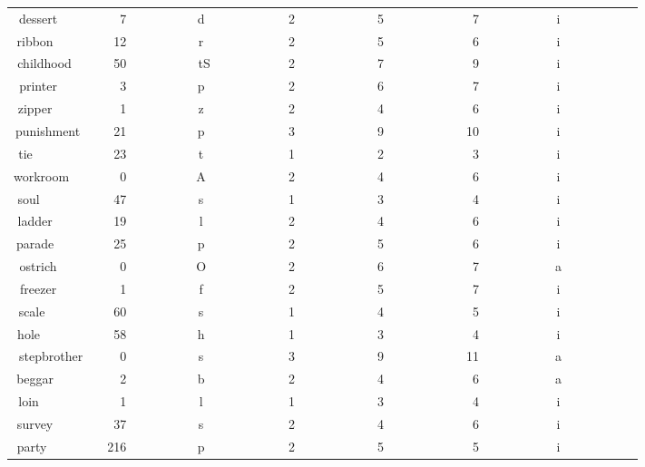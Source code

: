 \begin{longtable}{|c|c|c|c|c|c|c|}
dessert~~~~~&~~7~~~~~~~~~&d~~~~~~~~~~~&2~~~~~~~~~~~&5~~~~~~~~~~~&~7~~~~~~~~~~&i~~~~~~~~~~~\\ 
ribbon~~~~~~&~12~~~~~~~~~&r~~~~~~~~~~~&2~~~~~~~~~~~&5~~~~~~~~~~~&~6~~~~~~~~~~&i~~~~~~~~~~~\\ 
childhood~~~&~50~~~~~~~~~&tS~~~~~~~~~~&2~~~~~~~~~~~&7~~~~~~~~~~~&~9~~~~~~~~~~&i~~~~~~~~~~~\\ 
printer~~~~~&~~3~~~~~~~~~&p~~~~~~~~~~~&2~~~~~~~~~~~&6~~~~~~~~~~~&~7~~~~~~~~~~&i~~~~~~~~~~~\\ 
zipper~~~~~~&~~1~~~~~~~~~&z~~~~~~~~~~~&2~~~~~~~~~~~&4~~~~~~~~~~~&~6~~~~~~~~~~&i~~~~~~~~~~~\\ 
punishment~~&~21~~~~~~~~~&p~~~~~~~~~~~&3~~~~~~~~~~~&9~~~~~~~~~~~&10~~~~~~~~~~&i~~~~~~~~~~~\\ 
tie~~~~~~~~~&~23~~~~~~~~~&t~~~~~~~~~~~&1~~~~~~~~~~~&2~~~~~~~~~~~&~3~~~~~~~~~~&i~~~~~~~~~~~\\ 
workroom~~~~&~~0~~~~~~~~~&A~~~~~~~~~~~&2~~~~~~~~~~~&4~~~~~~~~~~~&~6~~~~~~~~~~&i~~~~~~~~~~~\\ 
soul~~~~~~~~&~47~~~~~~~~~&s~~~~~~~~~~~&1~~~~~~~~~~~&3~~~~~~~~~~~&~4~~~~~~~~~~&i~~~~~~~~~~~\\ 
ladder~~~~~~&~19~~~~~~~~~&l~~~~~~~~~~~&2~~~~~~~~~~~&4~~~~~~~~~~~&~6~~~~~~~~~~&i~~~~~~~~~~~\\ 
parade~~~~~~&~25~~~~~~~~~&p~~~~~~~~~~~&2~~~~~~~~~~~&5~~~~~~~~~~~&~6~~~~~~~~~~&i~~~~~~~~~~~\\ 
ostrich~~~~~&~~0~~~~~~~~~&O~~~~~~~~~~~&2~~~~~~~~~~~&6~~~~~~~~~~~&~7~~~~~~~~~~&a~~~~~~~~~~~\\ 
freezer~~~~~&~~1~~~~~~~~~&f~~~~~~~~~~~&2~~~~~~~~~~~&5~~~~~~~~~~~&~7~~~~~~~~~~&i~~~~~~~~~~~\\ 
scale~~~~~~~&~60~~~~~~~~~&s~~~~~~~~~~~&1~~~~~~~~~~~&4~~~~~~~~~~~&~5~~~~~~~~~~&i~~~~~~~~~~~\\ 
hole~~~~~~~~&~58~~~~~~~~~&h~~~~~~~~~~~&1~~~~~~~~~~~&3~~~~~~~~~~~&~4~~~~~~~~~~&i~~~~~~~~~~~\\ 
stepbrother~&~~0~~~~~~~~~&s~~~~~~~~~~~&3~~~~~~~~~~~&9~~~~~~~~~~~&11~~~~~~~~~~&a~~~~~~~~~~~\\ 
beggar~~~~~~&~~2~~~~~~~~~&b~~~~~~~~~~~&2~~~~~~~~~~~&4~~~~~~~~~~~&~6~~~~~~~~~~&a~~~~~~~~~~~\\ 
loin~~~~~~~~&~~1~~~~~~~~~&l~~~~~~~~~~~&1~~~~~~~~~~~&3~~~~~~~~~~~&~4~~~~~~~~~~&i~~~~~~~~~~~\\ 
survey~~~~~~&~37~~~~~~~~~&s~~~~~~~~~~~&2~~~~~~~~~~~&4~~~~~~~~~~~&~6~~~~~~~~~~&i~~~~~~~~~~~\\ 
party~~~~~~~&216~~~~~~~~~&p~~~~~~~~~~~&2~~~~~~~~~~~&5~~~~~~~~~~~&~5~~~~~~~~~~&i~~~~~~~~~~~\\ 

\end{longtable}
